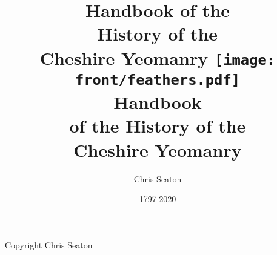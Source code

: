 \documentclass[a4paper,7pt]{book}
\title{Handbook of the \\ History of the \\ Cheshire Yeomanry}
\author{Chris Seaton}
\date{1797-2020}
\title{
  \texttt{[image: front/feathers.pdf]} \\
  \vspace{10mm}
  \huge Handbook \\
  \vspace{2mm}
  \Large of the History of the \\
  \Huge Cheshire Yeomanry
}
\begin{document}
\frontmatter

\maketitle

\vspace*{\fill}

\begin{center}
  Copyright  Chris Seaton
\end{center}

\setcounter{tocdepth}{0}
\tableofcontents{}

\mainmatter





\end{document}
